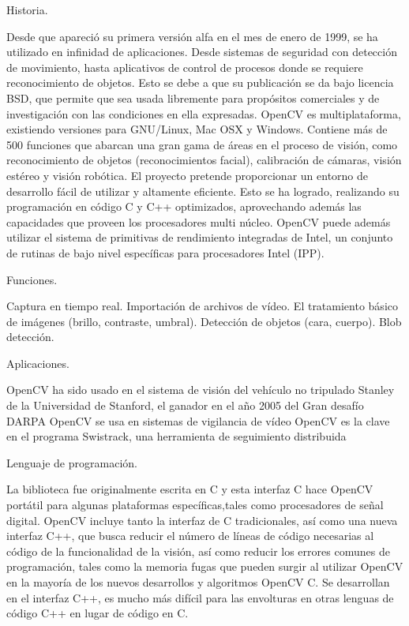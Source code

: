 \documentclass[12pt]{article}
\begin{document}
Historia.

Desde que apareció su primera versión alfa en el mes de enero de 1999, se ha utilizado en infinidad de aplicaciones. Desde sistemas de seguridad con detección de movimiento, hasta aplicativos de control de procesos donde se requiere reconocimiento de objetos. Esto se debe a que su publicación se da bajo licencia BSD, que permite que sea usada libremente para propósitos comerciales y de investigación con las condiciones en ella expresadas.
OpenCV es multiplataforma, existiendo versiones para GNU/Linux, Mac OSX y Windows. Contiene más de 500 funciones que abarcan una gran gama de áreas en el proceso de visión, como reconocimiento de objetos (reconocimientos facial), calibración de cámaras, visión estéreo y visión robótica.
El proyecto pretende proporcionar un entorno de desarrollo fácil de utilizar y altamente eficiente. Esto se ha logrado, realizando su programación en código C y C++ optimizados, aprovechando además las capacidades que proveen los procesadores multi núcleo. OpenCV puede además utilizar el sistema de primitivas de rendimiento integradas de Intel, un conjunto de rutinas de bajo nivel específicas para procesadores Intel (IPP).

Funciones.

Captura en tiempo real.
Importación de archivos de vídeo.
El tratamiento básico de imágenes (brillo, contraste, umbral).
Detección de objetos (cara, cuerpo).
Blob detección.

Aplicaciones.

OpenCV ha sido usado en el sistema de visión del vehículo no tripulado Stanley de la Universidad de Stanford, el ganador en el año 2005 del Gran desafío DARPA
OpenCV se usa en sistemas de vigilancia de vídeo
OpenCV es la clave en el programa Swistrack, una herramienta de seguimiento distribuida

Lenguaje de programación.

La biblioteca fue originalmente escrita en C y esta interfaz C hace OpenCV portátil para algunas plataformas específicas,tales como procesadores de señal digital.
OpenCV incluye tanto la interfaz de C tradicionales, así como una nueva interfaz C++, que busca reducir el número de líneas de código necesarias al código de la funcionalidad de la visión, así como reducir los errores comunes de programación, tales como la memoria fugas que pueden surgir al utilizar OpenCV en la mayoría de los nuevos desarrollos y algoritmos OpenCV C.
Se desarrollan en el interfaz C++, es mucho más difícil para las envolturas en otras lenguas de código C++ en lugar de código en C. \cite{SourgeForgeWebSite} \cite{UbaaWebSite} \cite{YahooWebSite}
\end{document}
